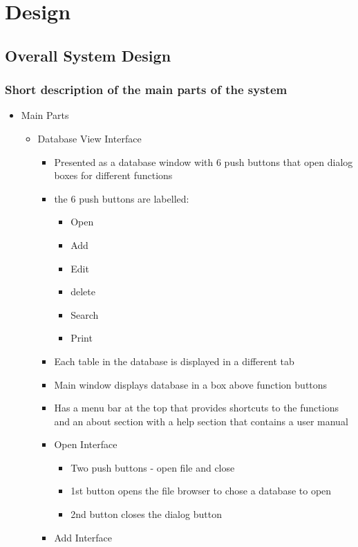  \chapter{Design}

\section{Overall System Design}

\subsection{Short description of the main parts of the system}

\begin {itemize}
	\item Main Parts
	\begin {itemize}
		\item Database View Interface
		\begin {itemize}
			\item Presented as a database window with 6 push buttons that open dialog boxes for different functions
			\item the 6 push buttons are labelled:
			\begin {itemize}
				\item Open
				\item Add
				\item Edit
				\item delete
				\item Search
				\item Print
			\end {itemize}
		\item Each table in the database is displayed in a different tab
		\item Main window displays database in a box above function buttons
		\item Has a menu bar at the top that provides shortcuts to the functions and an about section with a help section that contains   a user manual
	\item Open Interface
	\begin {itemize}
		\item Two push buttons - open file and close
		\item 1st button opens the file browser to chose a database to open
		\item 2nd button closes the dialog button
	\end {itemize}
	\item Add Interface

\end{itemize}
\end{itemize}
\end{itemize}
